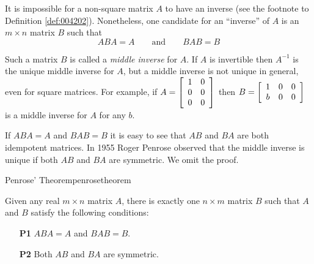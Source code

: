 \noindent It is impossible for a non-square matrix $A$ to have an inverse
(see the footnote to Definition \ref{def:004202}). Nonetheless, one candidate for an ``inverse'' of $A$ is an $m\times n$ matrix 
$B$ such that
\begin{equation*}
ABA=A \qquad \mbox{and} \qquad BAB=B
\end{equation*}

\noindent Such a matrix $B$ is called a \emph{middle inverse} for $A$. If $A$ is invertible then $A^{-1}$ is the unique middle inverse for $A$, but a
middle inverse is not unique in general, even for square matrices. For
example, if $A=
\left[ 
\begin{array}{cc}
1 & 0 \\ 
0 & 0 \\ 
0 & 0
\end{array}
\right] $ then $B=
\left[ 
\begin{array}{ccc}
1 & 0 & 0 \\ 
b & 0 & 0
\end{array}
\right] $ is a middle inverse for $A$ for any $b$.

If $ABA=A$ and $BAB=B$ it is easy to see that $AB$ and $BA$ are both
idempotent matrices. In 1955 Roger Penrose observed that the middle inverse
is unique if both $AB$ and $BA$ are symmetric. We omit the proof.

\begin{theorem}{Penrose' Theorem\footnotemark}{penrosetheorem}

Given any real $m\times n$ matrix $A$, there is exactly one $n\times m$ matrix $B$ such that $A$ and $B$ 
satisfy the following conditions:

\begin{enumerate}
\item[\textbf{P1}] $ABA=A$ and $BAB=B$.

\item[\textbf{P2}] Both $AB$ and $BA$ are symmetric.
\end{enumerate}
\end{theorem}


